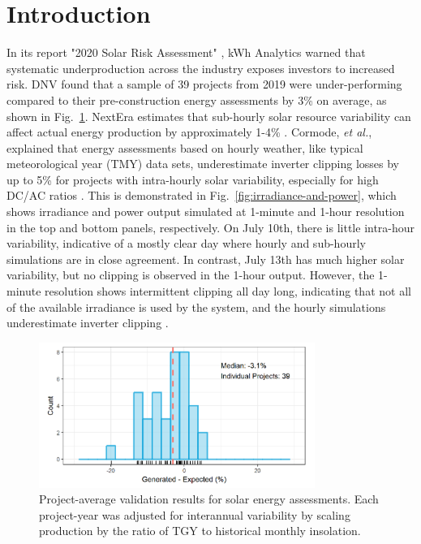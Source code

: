 \documentclass[conference]{IEEEtran}
\begin{document}
\section{Introduction}
In its report "2020 Solar Risk Assessment" \cite{Matsui2020}, kWh Analytics warned that systematic underproduction across the industry exposes investors to increased risk. DNV found that a sample of 39 projects from 2019 were under-performing compared to their pre-construction energy assessments by 3\% on average, as shown in Fig.~\ref{fig:project-underperformance}. NextEra estimates that sub-hourly solar resource variability can affect actual energy production by approximately 1-4\% \cite{Bradford}. Cormode, \textit{et al.}, explained that energy assessments based on hourly weather, like typical meteorological year (TMY) data sets, underestimate inverter clipping losses by up to 5\% for projects with intra-hourly solar variability, especially for high DC/AC ratios \cite{Cormode2019}. This is demonstrated in Fig.~\ref{fig:irradiance-and-power}, which shows irradiance and power output simulated at 1-minute and 1-hour resolution in the top and bottom panels, respectively. On July 10th, there is little intra-hour variability, indicative of a mostly clear day where hourly and sub-hourly simulations are in close agreement. In contrast, July 13th has much higher solar variability, but no clipping is observed in the 1-hour output. However, the 1-minute resolution shows intermittent clipping all day long, indicating that not all of the available irradiance is used by the system, and the hourly simulations underestimate inverter clipping \cite{Kharait}.


\begin{figure}[htbp]
\centerline{\includegraphics[width=9cm]{fig1.png}}
\caption{Project-average validation results for solar energy assessments. Each project-year was adjusted for interannual variability by scaling production by the ratio of TGY to historical monthly insolation.}
\label{fig:project-underperformance}
\end{figure}
\end{document}
